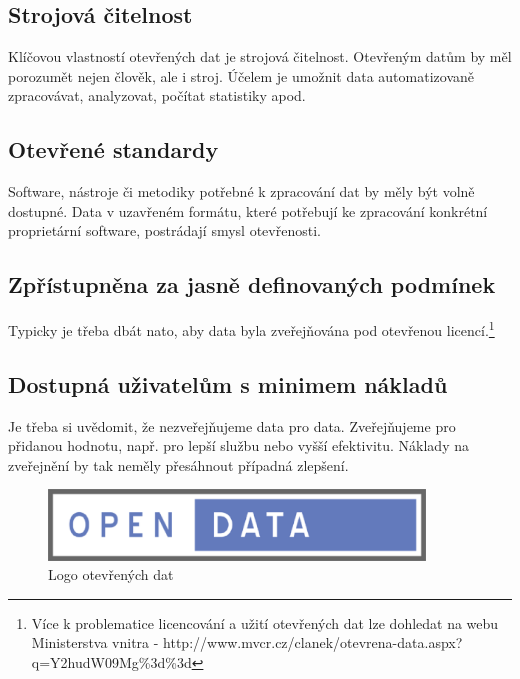 \subsection*{Strojová čitelnost}

Klíčovou vlastností otevřených dat je strojová čitelnost. Otevřeným datům by měl porozumět nejen člověk, ale i stroj. Účelem je umožnit data automatizovaně zpracovávat, analyzovat, počítat statistiky apod.

\subsection*{Otevřené standardy}

Software, nástroje či metodiky potřebné k zpracování dat by měly být volně dostupné. Data v uzavřeném formátu, které potřebují ke zpracování konkrétní proprietární software, postrádají smysl otevřenosti.

\subsection*{Zpřístupněna za jasně definovaných podmínek}

Typicky je třeba dbát nato, aby data byla zveřejňována pod otevřenou licencí.\footnote{Více k problematice licencování a užití otevřených dat lze dohledat na webu Ministerstva vnitra - http://www.mvcr.cz/clanek/otevrena-data.aspx?q=Y2hudW09Mg\%3d\%3d}

\subsection*{Dostupná uživatelům s minimem nákladů}

Je třeba si uvědomit, že nezveřejňujeme data pro data. Zveřejňujeme pro přidanou hodnotu, např. pro lepší službu nebo vyšší efektivitu. Náklady na zveřejnění by tak neměly přesáhnout případná zlepšení.
\newline

\begin{figure}[h]
\centerline{\includegraphics[width=100mm]{img/opendata.eps}}
\caption{Logo otevřených dat}
\label{modules}
\end{figure}

\newpage

